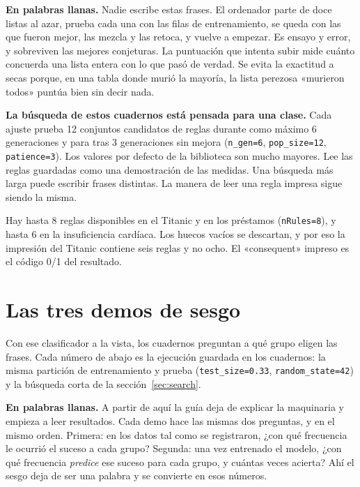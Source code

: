 \documentclass[11pt]{article}
\newcommand{\fn}[1]{\texttt{\small #1}}
\begin{document}
\begin{plainwords}
\textbf{En palabras llanas.} Nadie escribe estas frases. El ordenador parte de doce listas al azar, prueba cada una con las filas de entrenamiento, se queda con las que fueron mejor, las mezcla y las retoca, y vuelve a empezar. Es ensayo y error, y sobreviven las mejores conjeturas. La puntuación que intenta subir mide cuánto concuerda una lista entera con lo que pasó de verdad. Se evita la exactitud a secas porque, en una tabla donde murió la mayoría, la lista perezosa «murieron todos» puntúa bien sin decir nada.
\end{plainwords}

\begin{careful}
\textbf{La búsqueda de estos cuadernos está pensada para una clase.} Cada ajuste prueba 12 conjuntos candidatos de reglas durante como máximo 6 generaciones y para tras 3 generaciones sin mejora (\fn{n\_gen=6}, \fn{pop\_size=12}, \fn{patience=3}). Los valores por defecto de la biblioteca son mucho mayores. Lee las reglas guardadas como una demostración de las medidas. Una búsqueda más larga puede escribir frases distintas. La manera de leer una regla impresa sigue siendo la misma.
\end{careful}

Hay hasta 8 reglas disponibles en el Titanic y en los préstamos (\fn{nRules=8}), y hasta 6 en la insuficiencia cardíaca. Los huecos vacíos se descartan, y por eso la impresión del Titanic contiene seis reglas y no ocho. El «consequent» impreso es el código 0/1 del resultado.

\section{Las tres demos de sesgo}
\label{sec:picture}

Con ese clasificador a la vista, los cuadernos preguntan a qué grupo eligen las frases. Cada número de abajo es la ejecución guardada en los cuadernos: la misma partición de entrenamiento y prueba (\fn{test\_size=0.33}, \fn{random\_state=42}) y la búsqueda corta de la sección~\ref{sec:search}.

\begin{plainwords}
\textbf{En palabras llanas.} A partir de aquí la guía deja de explicar la maquinaria y empieza a leer resultados. Cada demo hace las mismas dos preguntas, y en el mismo orden. Primera: en los datos tal como se registraron, ¿con qué frecuencia le ocurrió el suceso a cada grupo? Segunda: una vez entrenado el modelo, ¿con qué frecuencia \emph{predice} ese suceso para cada grupo, y cuántas veces acierta? Ahí el sesgo deja de ser una palabra y se convierte en esos números.
\end{plainwords}
\end{document}
